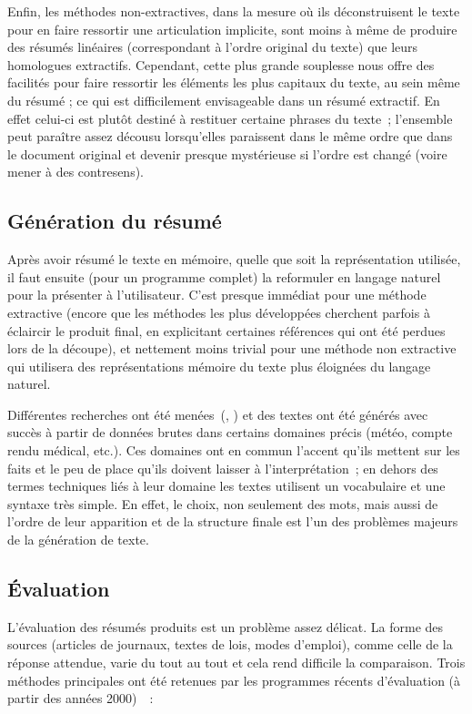 \documentclass[a4paper, 12pt]{article}
\begin{document}
Enfin, les méthodes non-extractives, dans la mesure où ils déconstruisent le texte pour en faire ressortir une articulation implicite, sont moins à même de produire des résumés linéaires (correspondant à l'ordre original du texte) que leurs homologues extractifs. Cependant, cette plus grande souplesse nous offre des facilités pour faire ressortir les éléments les plus capitaux du texte, au sein même du résumé ; ce qui est difficilement envisageable dans un résumé extractif. En effet celui-ci est plutôt destiné à restituer certaine phrases du texte~; l'ensemble peut paraître assez décousu lorsqu'elles paraissent dans le même ordre que dans le document original et devenir presque mystérieuse si l'ordre est changé (voire mener à des contresens).

\subsection{Génération du résumé}

Après avoir résumé le texte en mémoire, quelle que soit la représentation utilisée, il faut ensuite (pour un programme complet) la reformuler en langage naturel pour la présenter à l'utilisateur. C'est presque immédiat pour une méthode extractive (encore que les méthodes les plus développées cherchent parfois à éclaircir le produit final, en explicitant certaines références qui ont été perdues lors de la découpe), et nettement moins trivial pour une méthode non extractive qui utilisera des représentations mémoire du texte plus éloignées du langage naturel.

Différentes recherches ont été menées~(\cite{danlos_generation_2000}, \cite{horacek_building_2001}) et des textes ont été générés avec succès à partir de données brutes dans certains domaines précis (météo, compte rendu médical, etc.). Ces domaines ont en commun l'accent qu'ils mettent sur les faits et le peu de place qu'ils doivent laisser à l'interprétation~; en dehors des termes techniques liés à leur domaine les textes utilisent un vocabulaire et une syntaxe très simple. En effet, le choix, non seulement des mots, mais aussi de l'ordre de leur apparition et de la structure finale est l'un des problèmes majeurs de la génération de texte.

\subsection{Évaluation}

L'évaluation des résumés produits est un problème assez délicat. La forme des sources (articles de journaux, textes de lois, modes d'emploi), comme celle de la réponse attendue, varie du tout au tout et cela rend difficile la comparaison. Trois méthodes principales ont été retenues par les programmes récents d'évaluation (à partir des années 2000)~\cite[p.1453-1461]{jones_automatic_2007}~:
\end{document}

